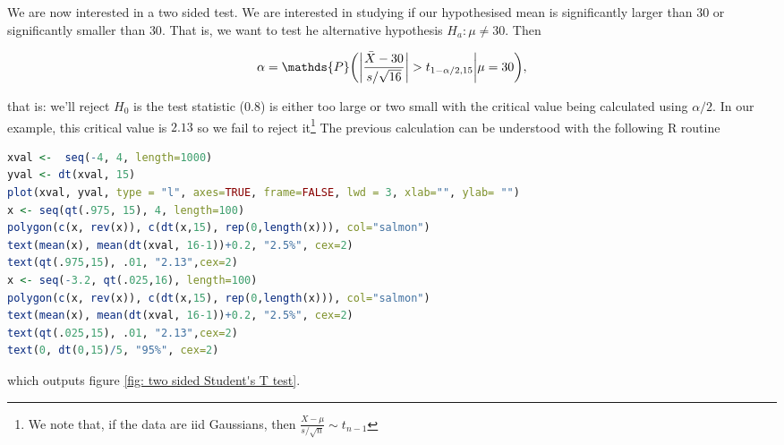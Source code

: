 \documentclass{homework}
\begin{document}
We are now interested in a two sided test. We are interested in studying if our hypothesised mean is significantly larger than $30$ or significantly smaller than $30$. That is, we want to test he alternative hypothesis $H_a: \mu \neq 30$. Then

$$
\alpha = \mathds{P}\bigg(\bigg|\frac{\Bar{X}-30}{s/\sqrt{16}}\bigg| > t_{1-\alpha/2, 15}\bigg| \mu = 30\bigg),
$$

that is: we'll reject $H_0$ is the test statistic (0.8) is either too large or two small with the critical value being calculated using $\alpha/2$. In our example, this critical value is $2.13$ so we fail to reject it\footnote{We note that, if the data are iid Gaussians, then $\frac{X-\mu}{s/\sqrt{n}} \sim t_{n-1}$} The previous calculation can be understood with the following R routine 

\begin{lstlisting}[language=R]
xval <-  seq(-4, 4, length=1000)
yval <- dt(xval, 15)
plot(xval, yval, type = "l", axes=TRUE, frame=FALSE, lwd = 3, xlab="", ylab= "")
x <- seq(qt(.975, 15), 4, length=100)
polygon(c(x, rev(x)), c(dt(x,15), rep(0,length(x))), col="salmon")
text(mean(x), mean(dt(xval, 16-1))+0.2, "2.5%", cex=2)
text(qt(.975,15), .01, "2.13",cex=2)
x <- seq(-3.2, qt(.025,16), length=100)
polygon(c(x, rev(x)), c(dt(x,15), rep(0,length(x))), col="salmon")
text(mean(x), mean(dt(xval, 16-1))+0.2, "2.5%", cex=2)
text(qt(.025,15), .01, "2.13",cex=2)
text(0, dt(0,15)/5, "95%", cex=2)
\end{lstlisting}

which outputs figure \ref{fig: two sided Student's T test}. \\

\clearpage
\end{document}
